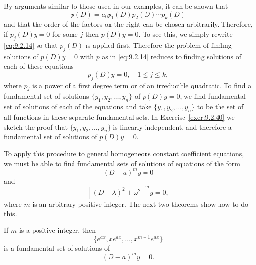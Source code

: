 \documentclass{ximera}
\begin{document}
By arguments similar to those used in our examples, it can be shown
that
\begin{equation} \label{eq:9.2.14}
p(D)=a_0p_1(D)p_2(D)\cdots p_k(D)
\end{equation}
and that the order of the factors on the right can be chosen
arbitrarily. Therefore, if $p_j(D)y=0$ for some $j$ then
$p(D)y=0$. To see this, we simply rewrite \eqref{eq:9.2.14} so that
$p_j(D)$ is applied first. Therefore the problem of finding solutions
of $p(D)y=0$ with $p$ as in \eqref{eq:9.2.14} reduces to finding solutions
of each of these equations
$$
p_j(D)y=0,\quad 1\leq j\leq k,
$$
where $p_j$ is a power of a first degree term or of an irreducible
quadratic. To find a fundamental set of solutions
$\{y_1,y_2,\dots,y_n\}$ of $p(D)y=0$, we find fundamental set of
solutions of each of the equations and take $\{y_1,y_2,\dots,y_n\}$ to
be the set of all functions in these separate fundamental sets. In
Exercise~\ref{exer:9.2.40} we sketch the proof that
$\{y_1,y_2,\dots,y_n\}$ is linearly independent, and therefore a
fundamental set of solutions of $p(D)y=0$.

To apply this procedure to general homogeneous constant coefficient
equations, we must be able to find fundamental sets of solutions of
equations of the form
$$
(D-a)^my=0
$$
and
$$
\left[(D-\lambda)^2+\omega^2\right]^my=0,
$$
where $m$ is an arbitrary positive integer. The next two theorems show
how to do this.

\begin{theorem}\label{thmtype:9.2.1}
If $m$ is a positive integer, then
\begin{equation} \label{eq:9.2.15}
\{e^{ax}, xe^{ax},\dots, x^{m-1}e^{ax}\}
\end{equation}
is a fundamental set of solutions of
\begin{equation} \label{eq:9.2.16}
(D-a)^my=0.
\end{equation}
\end{theorem}
\end{document}
